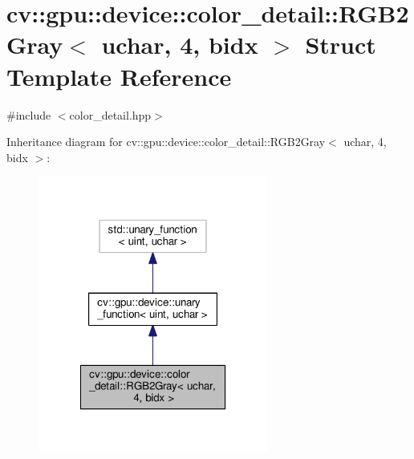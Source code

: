 \hypertarget{structcv_1_1gpu_1_1device_1_1color__detail_1_1RGB2Gray_3_01uchar_00_014_00_01bidx_01_4}{\section{cv\-:\-:gpu\-:\-:device\-:\-:color\-\_\-detail\-:\-:R\-G\-B2\-Gray$<$ uchar, 4, bidx $>$ Struct Template Reference}
\label{structcv_1_1gpu_1_1device_1_1color__detail_1_1RGB2Gray_3_01uchar_00_014_00_01bidx_01_4}
}


{\ttfamily \#include $<$color\-\_\-detail.\-hpp$>$}



Inheritance diagram for cv\-:\-:gpu\-:\-:device\-:\-:color\-\_\-detail\-:\-:R\-G\-B2\-Gray$<$ uchar, 4, bidx $>$\-:\nopagebreak
\begin{figure}[H]
\begin{center}
\leavevmode
\includegraphics[width=214pt]{structcv_1_1gpu_1_1device_1_1color__detail_1_1RGB2Gray_3_01uchar_00_014_00_01bidx_01_4__inherit__graph}
\end{center}
\end{figure}


